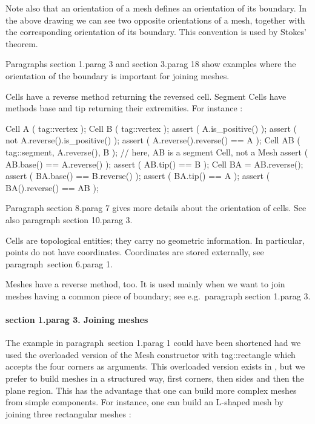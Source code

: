 Note also that an orientation of a mesh defines an orientation of its boundary.
In the above drawing we can see two opposite orientations of a mesh, together with
the corresponding orientation of its boundary.
This convention is used by Stokes' theorem.

Paragraphs \numb section 1.\numb parag 3 and \numb section 3.\numb parag 18 show examples where
the orientation of the boundary is important for joining meshes.

Cells have a {\codett reverse} method returning the reversed cell.
Segment {\codett Cell}s have methods {\codett base} and {\codett tip} returning their extremities.
For instance :

\verbatim
   Cell A ( tag::vertex );  Cell B ( tag::vertex );
   assert ( A.is_positive() );
   assert ( not A.reverse().is_positive() );
   assert ( A.reverse().reverse() == A );
   Cell AB ( tag::segment, A.reverse(), B );
   // here, AB is a segment Cell, not a Mesh
   assert ( AB.base() == A.reverse() );
   assert ( AB.tip() == B );
   Cell BA = AB.reverse();
   assert ( BA.base() == B.reverse() );
   assert ( BA.tip() == A );
   assert ( BA().reverse() == AB );
\endverbatim

Paragraph \numb section 8.\numb parag 7 gives more details about the orientation of cells.
See also paragraph \numb section 10.\numb parag 3.

Cells are topological entities; they carry no geometric information.
In particular, points do not have coordinates.
Coordinates are stored externally, see paragraph~\numb section 6.\numb parag 1.

{\codett Mesh}es have a {\codett reverse} method, too.
It is used mainly when we want to {\codett join} meshes having a common piece of boundary;
see e.g.\ paragraph \numb section 1.\numb parag 3.


\paragraph{\numb section 1.\numb parag 3. Joining meshes}

The example in paragraph~\numb section 1.\numb parag 1 could have been shortened had we used 
the overloaded version of the {\codett Mesh} constructor with {\codett tag::rectangle} which
accepts the four corners as arguments. 
This overloaded version exists in \maniFEM, but we prefer to build meshes in a structured way, 
first corners, then sides and then the plane region. 
This has the advantage that one can build more complex meshes from simple components. 
For instance, one can build an L-shaped mesh by joining three rectangular meshes :

